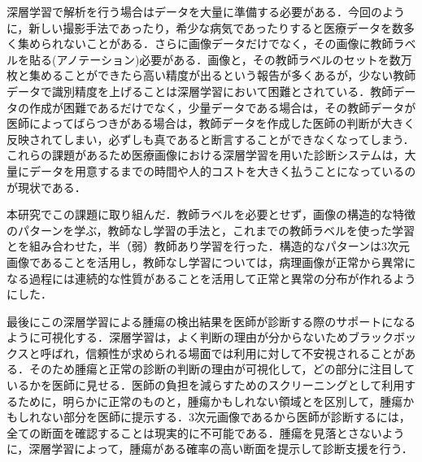 深層学習で解析を行う場合はデータを大量に準備する必要がある．今回のように，新しい撮影手法であったり，希少な病気であったりすると医療データを数多く集められないことがある．さらに画像データだけでなく，その画像に教師ラベルを貼る(アノテーション)必要がある．画像と，その教師ラベルのセットを数万枚と集めることができたら高い精度が出るという報告が多くあるが，少ない教師データで識別精度を上げることは深層学習において困難とされている．教師データの作成が困難であるだけでなく，少量データである場合は，その教師データが医師によってばらつきがある場合は，教師データを作成した医師の判断が大きく反映されてしまい，必ずしも真であると断言することができなくなってしまう．これらの課題があるため医療画像における深層学習を用いた診断システムは，大量にデータを用意するまでの時間や人的コストを大きく払うことになっているのが現状である．

本研究でこの課題に取り組んだ．教師ラベルを必要とせず，画像の構造的な特徴のパターンを学ぶ，教師なし学習の手法と，これまでの教師ラベルを使った学習とを組み合わせた，半（弱）教師あり学習を行った．構造的なパターンは3次元画像であることを活用し，教師なし学習については，病理画像が正常から異常になる過程には連続的な性質があることを活用して正常と異常の分布が作れるようにした．


最後にこの深層学習による腫瘍の検出結果を医師が診断する際のサポートになるように可視化する．深層学習は，よく判断の理由が分からないためブラックボックスと呼ばれ，信頼性が求められる場面では利用に対して不安視されることがある．そのため腫瘍と正常の診断の判断の理由が可視化して，どの部分に注目しているかを医師に見せる．医師の負担を減らすためのスクリーニングとして利用するために，明らかに正常のものと，腫瘍かもしれない領域とを区別して，腫瘍かもしれない部分を医師に提示する．3次元画像であるから医師が診断するには，全ての断面を確認することは現実的に不可能である．腫瘍を見落とさないように，深層学習によって，腫瘍がある確率の高い断面を提示して診断支援を行う．
